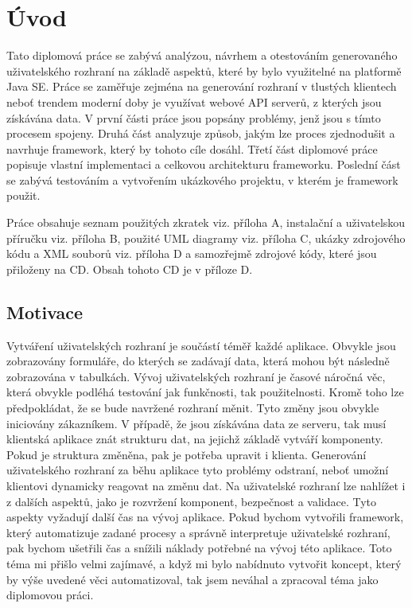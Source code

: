 \chapter{Úvod}
Tato diplomová práce se zabývá analýzou, návrhem a otestováním generovaného uživatelského rozhraní na základě aspektů, které by bylo využitelné na platformě Java SE. Práce se zaměřuje zejména na generování rozhraní v tlustých klientech neboť trendem moderní doby je využívat webové API serverů, z kterých jsou získávána data. V první části práce jsou popsány problémy, jenž jsou s tímto procesem spojeny. Druhá část analyzuje způsob, jakým lze proces zjednodušit a navrhuje framework, který by tohoto cíle dosáhl. Třetí část diplomové práce popisuje vlastní implementaci a celkovou architekturu frameworku. Poslední část se zabývá testováním a vytvořením ukázkového projektu, v kterém je framework použit.

Práce obsahuje seznam použitých zkratek viz. příloha A, instalační a uživatelskou příručku viz. příloha B, použité UML diagramy viz. příloha C, ukázky zdrojového kódu a XML souborů viz. příloha D a samozřejmě zdrojové kódy, které jsou přiloženy na CD. Obsah tohoto CD je v příloze D.
\section{Motivace}
Vytváření uživatelských rozhraní je součástí téměř každé aplikace. Obvykle jsou zobrazovány formuláře, do kterých se zadávají data, která mohou být následně zobrazována v tabulkách. Vývoj uživatelských rozhraní je časové náročná věc, která obvykle podléhá testování jak funkčnosti, tak použitelnosti. Kromě toho lze předpokládat, že se bude navržené rozhraní měnit. Tyto změny jsou obvykle iniciovány zákazníkem. V případě, že jsou získávána data ze serveru, tak musí klientská aplikace znát strukturu dat, na jejichž základě vytváří komponenty. Pokud je struktura změněna, pak je potřeba upravit i klienta. Generování uživatelského rozhraní za běhu aplikace tyto problémy odstraní, neboť umožní klientovi dynamicky reagovat na změnu dat. Na uživatelské rozhraní lze nahlížet i z dalších aspektů, jako je rozvržení komponent, bezpečnost a validace. Tyto aspekty vyžadují další čas na vývoj aplikace. Pokud bychom vytvořili framework, který automatizuje zadané procesy a správně interpretuje uživatelské rozhraní, pak bychom ušetřili čas a snížili náklady potřebné na vývoj této aplikace. Toto téma mi přišlo velmi zajímavé, a když mi bylo nabídnuto vytvořit koncept, který by výše uvedené věci automatizoval, tak jsem neváhal a zpracoval téma jako diplomovou práci.